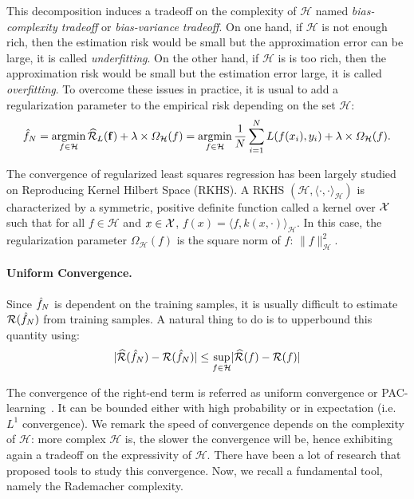 This decomposition induces a tradeoff on the complexity of $\mathcal{H}$ named \emph{bias-complexity tradeoff} or \emph{bias-variance tradeoff}. On one hand, if $\mathcal{H}$ is not enough rich, then the estimation risk would be small but the approximation error can be large, it is called \emph{underfitting}. On the other hand, if $\mathcal{H}$ is is too rich, then the approximation risk would be small but the estimation error large, it is called \emph{overfitting}. To overcome these issues in practice, it is usual to add a regularization parameter to the empirical risk depending on the set $\mathcal{H}$:
\begin{align*}
    \hat{f}_N = \operatorname*{argmin}_{f\in\mathcal{H}}\widehat{\mathcal{R}}_{L}(\mathbf{f}) +\lambda\times\Omega_\mathcal{H}(f)= \operatorname*{argmin}_{f\in\mathcal{H}}\frac{1}{N}\sum_{i=1}^N L(f(x_i),y_i)+\lambda\times\Omega_\mathcal{H}(f).
\end{align*}

The convergence of regularized least squares regression has been largely studied on Reproducing Kernel Hilbert Space (RKHS). A RKHS $(\mathcal{H},\langle\cdot,\cdot\rangle_\mathcal{H})$ is characterized by a symmetric, positive definite function called a kernel over $\mathcal{X}$ such that for all $f\in\mathcal{H}$ and $x\in\mathcal{X}$, $f(x)= \langle f,k(x,\cdot)\rangle_\mathcal{H}$. In this case, the regularization parameter $\Omega_\mathcal{H}(f)$ is the square norm of $f$: $\lVert f\rVert_\mathcal{H}^2$. 


\paragraph{Uniform Convergence.} Since $\hat{f}_N$ is dependent on the training samples, it is usually difficult to estimate $\mathcal{R}(\hat{f}_N)$ from training samples. A natural thing to do is to upperbound this quantity using:
\begin{align*}
    \lvert\widehat{\mathcal{R}}(\hat{f}_N) - \mathcal{R}(\hat{f}_N)\rvert\leq\sup_{f\in\mathcal{H}}    \lvert\widehat{\mathcal{R}}(f) - \mathcal{R}(f)\rvert
\end{align*}

The convergence of the right-end term is referred as uniform convergence or PAC-learning~\citep{valiant1984theory}. It can be bounded either with high probability or in expectation (i.e. $L^1$ convergence). We remark the speed of convergence depends on the complexity of $\mathcal{H}$: more complex $\mathcal{H}$ is, the slower the convergence will be, hence exhibiting again a tradeoff on the expressivity of $\mathcal{H}$. There have been a  lot of research that proposed tools to study this convergence. Now, we recall a fundamental tool, namely the Rademacher complexity.



